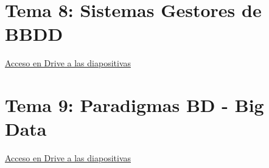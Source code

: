 \documentclass[12pt, twoside, openright]{report} %
\begin{document}
\chapter{Tema 8: Sistemas Gestores de BBDD}
\href{https://drive.google.com/file/d/1bNijgCoB1RsacVkvo4GD0137ZrLKkfCQ}{Acceso en Drive a las diapositivas}

\chapter{Tema 9: Paradigmas BD - Big Data}
\href{https://drive.google.com/file/d/1F5iWaJLfB0CZLzP7SKCbNV3HG9CQa6Sh}{Acceso en Drive a las diapositivas}
\end{document}
